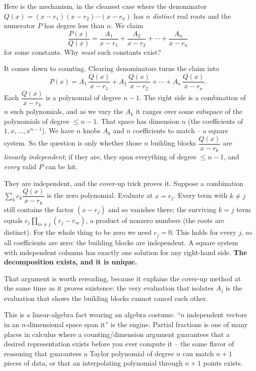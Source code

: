 \begin{whybox}
Here is the mechanism, in the cleanest case where the denominator
$Q(x) = (x-r_1)(x-r_2)\cdots(x-r_n)$ has $n$ \emph{distinct} real roots and
the numerator $P$ has degree less than $n$. We claim
\[
\frac{P(x)}{Q(x)} = \frac{A_1}{x-r_1} + \frac{A_2}{x-r_2} + \cdots +
\frac{A_n}{x-r_n}
\]
for some constants. Why \emph{must} such constants exist?

It comes down to counting. Clearing denominators turns the claim into
\[
P(x) = A_1\,\frac{Q(x)}{x-r_1} + A_2\,\frac{Q(x)}{x-r_2} + \cdots +
A_n\,\frac{Q(x)}{x-r_n}.
\]
Each $\dfrac{Q(x)}{x-r_k}$ is a polynomial of degree $n-1$. The right side is a
combination of $n$ such polynomials, and as we vary the $A_k$ it ranges over
some subspace of the polynomials of degree $\le n-1$. That space has dimension
$n$ (the coefficients of $1, x, \ldots, x^{n-1}$). We have $n$ knobs $A_k$ and
$n$ coefficients to match -- a square system. So the question is only whether
those $n$ building blocks $\dfrac{Q(x)}{x-r_k}$ are \emph{linearly
independent}; if they are, they span everything of degree $\le n-1$, and
\emph{every} valid $P$ can be hit.

They are independent, and the cover-up trick proves it. Suppose a combination
$\sum_k c_k \dfrac{Q(x)}{x-r_k}$ is the zero polynomial. Evaluate at
$x = r_j$. Every term with $k \neq j$ still contains the factor $(x - r_j)$ and
so vanishes there; the surviving $k=j$ term equals $c_j \prod_{m\neq
j}(r_j - r_m)$, a product of nonzero numbers (the roots are distinct). For the
whole thing to be zero we need $c_j = 0$. This holds for every $j$, so all
coefficients are zero: the building blocks are independent. A square system
with independent columns has exactly one solution for any right-hand side.
\textbf{The decomposition exists, and it is unique.}
\end{whybox}

That argument is worth rereading, because it explains the cover-up method at
the same time as it proves existence: the very evaluation that isolates $A_j$
is the evaluation that shows the building blocks cannot cancel each other.

\begin{connectionbox}
This is a linear-algebra fact wearing an algebra costume. ``$n$ independent
vectors in an $n$-dimensional space span it'' is the engine. Partial fractions
is one of many places in calculus where a counting/dimension argument
guarantees that a desired representation exists before you ever compute it --
the same flavor of reasoning that guarantees a Taylor polynomial of degree $n$
can match $n+1$ pieces of data, or that an interpolating polynomial through
$n+1$ points exists.
\end{connectionbox}

